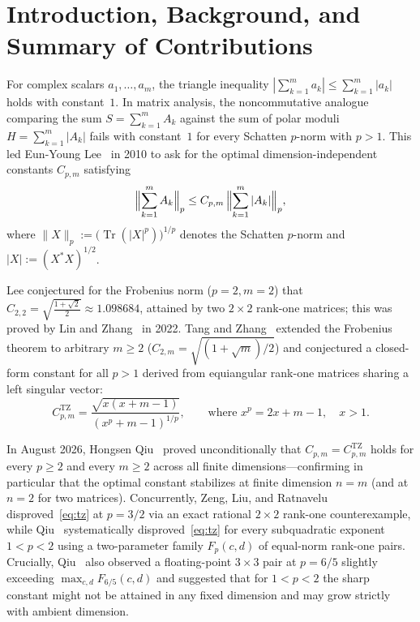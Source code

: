 \documentclass[10pt,letterpaper]{article}
\newcommand{\Tr}{\operatorname{Tr}}
\newcommand{\TZ}{\mathrm{TZ}}
\begin{document}
\begin{tcolorbox}[statusbox]
machine-checked without floats); Section~\ref{sec:open_core} gives an exact demarcation of the remaining open obstructions. No external human peer review has yet been performed.}
\end{tcolorbox}

\section{Introduction, Background, and Summary of Contributions}

For complex scalars $a_1,\dots,a_m$, the triangle inequality $|\sum_{k=1}^m a_k| \le \sum_{k=1}^m |a_k|$ holds with constant~$1$. In matrix analysis, the noncommutative analogue comparing the sum $S = \sum_{k=1}^m A_k$ against the sum of polar moduli $H = \sum_{k=1}^m |A_k|$ fails with constant~$1$ for every Schatten $p$-norm with $p > 1$. This led Eun-Young Lee~\cite{Lee2010,Lee2011} in 2010 to ask for the optimal dimension-independent constants $C_{p,m}$ satisfying
\begin{equation}\label{eq:lee}
  \Bigl\|\sum_{k=1}^m A_k\Bigr\|_p \le C_{p,m}\,\Bigl\|\sum_{k=1}^m |A_k|\Bigr\|_p,
\end{equation}
where $\|X\|_p := \bigl(\Tr(|X|^p)\bigr)^{1/p}$ denotes the Schatten $p$-norm and $|X| := (X^* X)^{1/2}$.

Lee conjectured for the Frobenius norm ($p = 2, m = 2$) that $C_{2,2} = \sqrt{\frac{1+\sqrt{2}}{2}} \approx 1.098684$, attained by two $2\times 2$ rank-one matrices; this was proved by Lin and Zhang~\cite{LinZhang2022} in 2022. Tang and Zhang~\cite{TangZhang2026} extended the Frobenius theorem to arbitrary $m \ge 2$ ($C_{2,m} = \sqrt{(1+\sqrt{m})/2}$) and conjectured a closed-form constant for all $p > 1$ derived from equiangular rank-one matrices sharing a left singular vector:
\begin{equation}\label{eq:tz}
  C_{p,m}^{\TZ} = \frac{\sqrt{x(x + m - 1)}}{(x^p + m - 1)^{1/p}},
  \qquad \text{where } x^p = 2x + m - 1,\quad x > 1.
\end{equation}

In August 2026, Hongsen Qiu~\cite{Qiu2026} proved unconditionally that $C_{p,m} = C_{p,m}^{\TZ}$ holds for every $p \ge 2$ and every $m \ge 2$ across all finite dimensions—confirming in particular that the optimal constant stabilizes at finite dimension $n = m$ (and at $n = 2$ for two matrices). Concurrently, Zeng, Liu, and Ratnavelu~\cite{Zeng2026} disproved~\eqref{eq:tz} at $p = 3/2$ via an exact rational $2\times 2$ rank-one counterexample, while Qiu~\cite{Qiu2026} systematically disproved~\eqref{eq:tz} for every subquadratic exponent $1 < p < 2$ using a two-parameter family $F_p(c,d)$ of equal-norm rank-one pairs. Crucially, Qiu~\cite[\S5]{Qiu2026} also observed a floating-point $3\times 3$ pair at $p = 6/5$ slightly exceeding $\max_{c,d} F_{6/5}(c,d)$ and suggested that for $1 < p < 2$ the sharp constant might not be attained in any fixed dimension and may grow strictly with ambient dimension.
\end{document}
